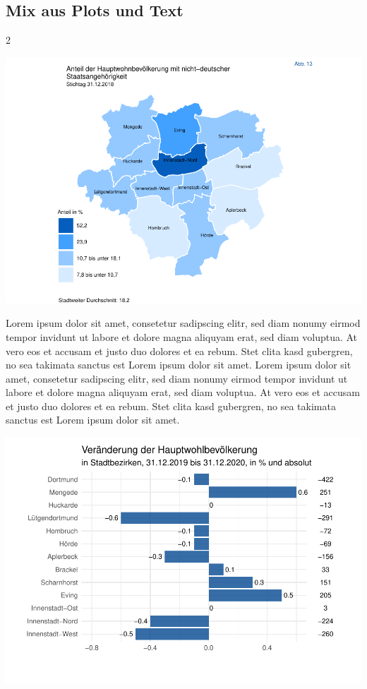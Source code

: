 \documentclass[
  a4paper,
  twoside]{article}
\begin{document}
\newpage

\hypertarget{mix-aus-plots-und-text}{%
\subsection{Mix aus Plots und Text}\label{mix-aus-plots-und-text}}

\begin {multicols}{2}

\begin{flushright}\includegraphics[width=1\linewidth]{2021-03-02_Beispiel_files/figure-latex/Plot map-1} \end{flushright}

Lorem ipsum dolor sit amet, consetetur sadipscing elitr, sed diam nonumy eirmod tempor invidunt ut labore et dolore magna aliquyam erat, sed diam voluptua. At vero eos et accusam et justo duo dolores et ea rebum. Stet clita kasd gubergren, no sea takimata sanctus est Lorem ipsum dolor sit amet. Lorem ipsum dolor sit amet, consetetur sadipscing elitr, sed diam nonumy eirmod tempor invidunt ut labore et dolore magna aliquyam erat, sed diam voluptua. At vero eos et accusam et justo duo dolores et ea rebum. Stet clita kasd gubergren, no sea takimata sanctus est Lorem ipsum dolor sit amet.

\includegraphics[width=1\linewidth]{2021-03-02_Beispiel_files/figure-latex/unnamed-chunk-1-1}


\end{multicols}
\end{document}
